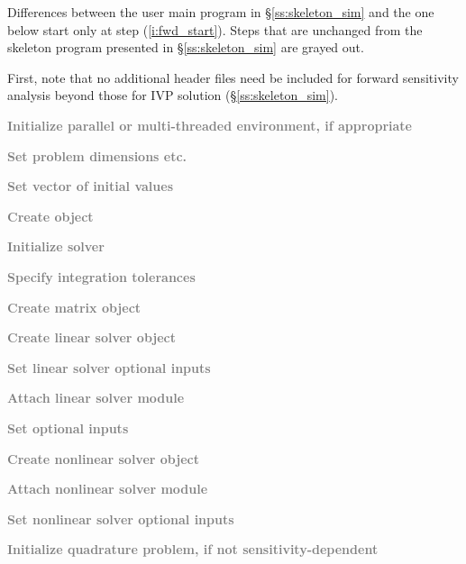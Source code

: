 Differences between the user main program in \S\ref{ss:skeleton_sim} and
the one below start only at step (\ref{i:fwd_start}).
Steps that are unchanged from the skeleton program presented in
\S\ref{ss:skeleton_sim} are grayed out.

First, note that no additional header files need be included for
forward sensitivity analysis beyond those for IVP solution
(\S\ref{ss:skeleton_sim}).
\begin{Steps}
  
\item 
  \textcolor{gray}{\bf Initialize parallel or multi-threaded environment,
  if appropriate}

\item
  \textcolor{gray}{\bf Set problem dimensions etc.}

\item
  \textcolor{gray}{\bf Set vector of initial values}
 
\item
  \textcolor{gray}{\bf Create {\cvodes} object}

\item
  \textcolor{gray}{\bf Initialize {\cvodes} solver}

\item
  \textcolor{gray}{\bf Specify integration tolerances}

\item
  \textcolor{gray}{\bf Create matrix object}

\item
  \textcolor{gray}{\bf Create linear solver object}

\item
  \textcolor{gray}{\bf Set linear solver optional inputs}

\item
  \textcolor{gray}{\bf Attach linear solver module}

\item
  \textcolor{gray}{\bf Set optional inputs}

\item
  \textcolor{gray}{\bf Create nonlinear solver object}

\item
  \textcolor{gray}{\bf Attach nonlinear solver module}

\item
  \textcolor{gray}{\bf Set nonlinear solver optional inputs}

\item
  \textcolor{gray}{\bf Initialize quadrature problem, if not sensitivity-dependent}


\end{Steps}
